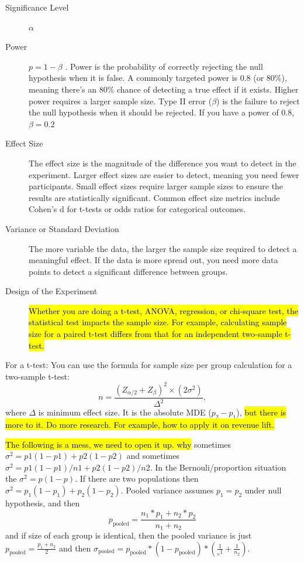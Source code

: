 \begin{description}
\item [Significance Level] $\alpha$
\item [Power] $p=1-\beta$ . Power is the probability of correctly rejecting the null hypothesis when it is false. 
A commonly targeted power is 0.8 (or 80\%), meaning there’s an 80\% chance of detecting a true effect if it exists. 
Higher power requires a larger sample size.
Type II error ($\beta$) is the failure to reject the null hypothesis when it should be rejected. 
If you have a power of 0.8, $\beta = 0.2$
\item [Effect Size] The effect size is the magnitude of the difference you want to detect in the experiment. Larger effect sizes are easier to detect, meaning you need fewer participants. Small effect sizes require larger sample sizes to ensure the results are statistically significant.
Common effect size metrics include Cohen's d for t-tests or odds ratios for categorical outcomes.
\item [Variance or Standard Deviation] The more variable the data, the larger the sample size required to detect a meaningful effect. If the data is more spread out, you need more data points to detect a significant difference between groups.
\item [Design of the Experiment] \hl{Whether you are doing a t-test, ANOVA, regression, or chi-square test, the statistical test impacts the sample size. For example, calculating sample size for a paired t-test differs from that for an independent two-sample t-test.}
\end{description}

For a t-test: You can use the formula for sample size per group calculation for a two-sample t-test:
\begin{equation}
n = \frac{(Z_{\alpha/2} + Z_\beta)^2 \times (2 \sigma^2)}{\Delta^2},
\end{equation}
where $\Delta$ is minimum effect size. It is the absolute MDE ($p_2 - p_1$),
\hl{but there is more to it. Do more research. For example, how to apply it on revenue lift.}

\hl{The following is a mess, we need to open it up. why}
sometimes $\sigma^2 = p1 (1-p1) + p2(1-p2)$ and sometimes
$\sigma^2 = p1 (1-p1)/n1 + p2(1-p2)/n2$.
In the Bernouli/proportion situation the $\sigma^2 = p (1-p)$.
If there are two populations then $\sigma^2 = p_1 (1-p_1) + p_2 (1-p_2)$.
Pooled variance assumes $p_1 = p_2$ under null hypothesis, and
then 
\[p_{\text{pooled}} = \frac{n_1*p_1 + n_2*p_2}{n_1 + n_2}\]
and if size of each group is identical, then the pooled variance is just 
$p_{\text{pooled}} = \frac{p_1 + n_2}{2}$ and then $\sigma_{\text{pooled}} = p_{\text{pooled}} * (1 - p_{\text{pooled}}) * (\frac{1}{_n1} + \frac{1}{n_2})$.

